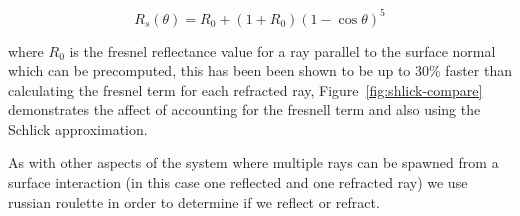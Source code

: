 \begin{equation}
R_s(\theta)=R_0 + \left(1 + R_0\right)\left(1 - \cos\theta\right)^5
\label{eq:schlick}
\end{equation}

where $R_0$ is the fresnel reflectance value for a ray parallel to the surface normal which can be precomputed,
this has been been shown to be up to 30\% faster \cite{deGreve06} than calculating the fresnel term for each refracted ray, Figure~\ref{fig:shlick-compare}
demonstrates the affect of accounting for the fresnell term and also using the Schlick approximation.

As with other aspects of the system where multiple rays can be spawned from a surface interaction (in this case one reflected and one refracted ray)
we use russian roulette in order to determine if we reflect or refract.


